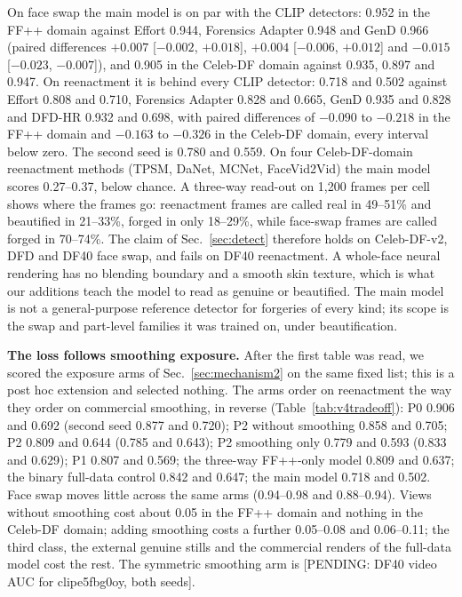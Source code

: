 On face swap the main model is on par with the CLIP detectors: 0.952 in the FF++ domain against Effort 0.944,
Forensics Adapter 0.948 and GenD 0.966 (paired differences $+0.007$ [$-0.002$, $+0.018$], $+0.004$ [$-0.006$, $+0.012$]
and $-0.015$ [$-0.023$, $-0.007$]), and 0.905 in the Celeb-DF domain against 0.935, 0.897 and 0.947. On reenactment it is
behind every CLIP detector: 0.718 and 0.502 against Effort 0.808 and 0.710, Forensics Adapter 0.828 and 0.665, GenD
0.935 and 0.828 and DFD-HR 0.932 and 0.698, with paired differences of $-0.090$ to $-0.218$ in the FF++ domain and
$-0.163$ to $-0.326$ in the Celeb-DF domain, every interval below zero. The second seed is 0.780 and 0.559. On four
Celeb-DF-domain reenactment methods (TPSM, DaNet, MCNet, FaceVid2Vid) the main model scores 0.27--0.37, below chance.
A three-way read-out on 1,200 frames per cell shows where the frames go: reenactment frames are called real in
49--51\% and beautified in 21--33\%, forged in only 18--29\%, while face-swap frames are called forged in 70--74\%. The
claim of Sec.~\ref{sec:detect} therefore holds on Celeb-DF-v2, DFD and DF40 face swap, and fails on DF40 reenactment. A
whole-face neural rendering has no blending boundary and a smooth skin texture, which is what our additions teach the
model to read as genuine or beautified. The main model is not a general-purpose reference detector for forgeries of
every kind; its scope is the swap and part-level families it was trained on, under beautification.

\textbf{The loss follows smoothing exposure.} After the first table was read, we scored the exposure arms of
Sec.~\ref{sec:mechanism2} on the same fixed list; this is a post hoc extension and selected nothing. The arms order on
reenactment the way they order on commercial smoothing, in reverse (Table~\ref{tab:v4tradeoff}): P0 0.906 and 0.692
(second seed 0.877 and 0.720); P2 without smoothing 0.858 and 0.705; P2 0.809 and 0.644 (0.785 and 0.643); P2 smoothing
only 0.779 and 0.593 (0.833 and 0.629); P1 0.807 and 0.569; the three-way FF++-only model 0.809 and 0.637; the binary
full-data control 0.842 and 0.647; the main model 0.718 and 0.502. Face swap moves little across the same arms
(0.94--0.98 and 0.88--0.94). Views without smoothing cost about 0.05 in the FF++ domain and nothing in the Celeb-DF
domain; adding smoothing costs a further 0.05--0.08 and 0.06--0.11; the third class, the external genuine stills and the
commercial renders of the full-data model cost the rest. The symmetric smoothing arm is
[PENDING: DF40 video AUC for clipe5fbg0oy, both seeds].

